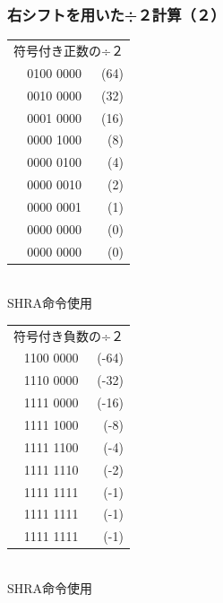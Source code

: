 \documentclass{beamer}                 %
\begin{document}
\begin{frame}
  \frametitle{右シフトを用いた÷２計算（２）}
  \begin{minipage}{0.48\columnwidth}
    \begin{center}
      {\ttfamily%
        \begin{tabular}{r r}
          \multicolumn{2}{c}{符号付き正数の÷２} \\
          0100 0000 & (64) \\
          0010 0000 & (32) \\
          0001 0000 & (16) \\
          0000 1000 & (8)  \\
          0000 0100 & (4)  \\
          0000 0010 & (2)  \\
          0000 0001 & (1)  \\
          0000 0000 & (0)  \\
          0000 0000 & (0)  \\
        \end{tabular}
      }\\
      \vspace{0.5cm}
      SHRA命令使用
    \end{center}
  \end{minipage}
  \begin{minipage}{0.48\columnwidth}
    \begin{center}
      {\ttfamily%
        \begin{tabular}{r r}
          \multicolumn{2}{c}{符号付き負数の÷２} \\
          1100 0000 & (-64) \\
          1110 0000 & (-32) \\
          1111 0000 & (-16) \\
          1111 1000 & (-8)  \\
          1111 1100 & (-4)  \\
          1111 1110 & (-2)  \\
          1111 1111 & (-1)  \\
          1111 1111 & (-1)  \\
          1111 1111 & (-1)  \\
        \end{tabular}
      }\\
      \vspace{0.5cm}
      SHRA命令使用
    \end{center}
  \end{minipage}
  \vfill
\end{frame}
\end{document}
